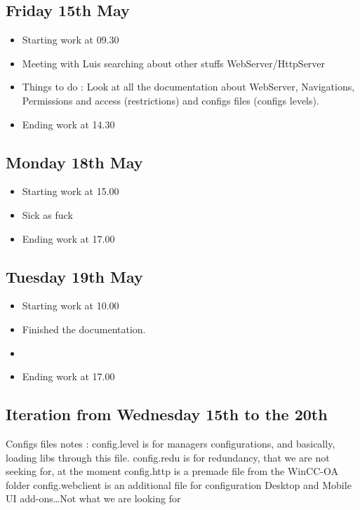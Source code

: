 \documentclass[a4paper, 10pt]{article}
\begin{document}
\subsection*{Friday 15th May}
\begin{itemize}
    \item Starting work at 09.30
    \item Meeting with Luis searching about other stuffs WebServer/HttpServer
    \item Things to do : Look at all the documentation about WebServer, Navigations, Permissions and access (restrictions) and configs files (configs levels).
    \item Ending work at 14.30
\end{itemize}

\subsection*{Monday 18th May}
\begin{itemize}
    \item Starting work at 15.00
    \item Sick as fuck
    \item Ending work at 17.00
\end{itemize}

\subsection*{Tuesday 19th May}
\begin{itemize}
    \item Starting work at 10.00
    \item Finished the documentation.
    \item 
    \item Ending work at 17.00
\end{itemize}

\subsection*{Iteration from Wednesday 15th to the 20th}

Configs files notes : 
config.level is for managers configurations, and basically, loading libs through this file.
config.redu is for redundancy, that we are not seeking for, at the moment
config.http is a premade file from the WinCC-OA folder
config.webclient is an additional file for configuration Desktop and Mobile UI add-ons\dots Not what we are looking for
\end{document}
